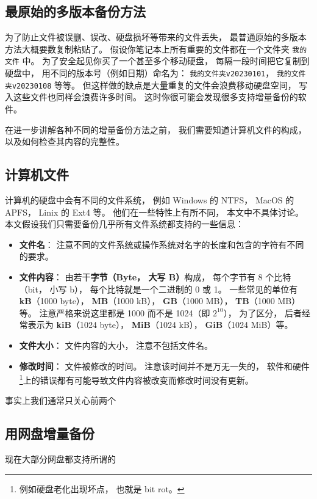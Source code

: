 
\subsection{最原始的多版本备份方法}
为了防止文件被误删、误改、硬盘损坏等带来的文件丢失， 最普通原始的多版本方法大概要数复制粘贴了。 假设你笔记本上所有重要的文件都在一个文件夹 \verb|我的文件| 中。 为了安全起见你买了一个甚至多个移动硬盘， 每隔一段时间把它复制到硬盘中， 用不同的版本号（例如日期）命名为： \verb|我的文件夹v20230101|， \verb|我的文件夹v20230108| 等等。 但这样做的缺点是大量重复的文件会浪费移动硬盘空间， 写入这些文件也同样会浪费许多时间。 这时你很可能会发现很多支持增量备份的软件。

在进一步讲解各种不同的增量备份方法之前， 我们需要知道计算机文件的构成， 以及如何检查其内容的完整性。

\subsection{计算机文件}
计算机的硬盘中会有不同的文件系统， 例如 Windows 的 NTFS， MacOS 的 APFS， Linix 的 Ext4 等。 他们在一些特性上有所不同， 本文中不具体讨论。 本文假设我们只需要备份几乎所有文件系统都支持的一些信息：
\begin{itemize}
\item \textbf{文件名}： 注意不同的文件系统或操作系统对名字的长度和包含的字符有不同的要求。
\item \textbf{文件内容}： 由若干\textbf{字节（Byte， 大写 B）}构成， 每个字节有 8 个比特（bit， 小写 b）， 每个比特就是一个二进制的 0 或 1。 一些常见的单位有 \textbf{kB}（1000 byte）， \textbf{MB}（1000 kB）， \textbf{GB}（1000 MB）， \textbf{TB}（1000 MB）等。 注意严格来说这里都是 1000 而不是 1024（即 $2^{10}$）， 为了区分， 后者经常表示为 \textbf{kiB}（1024 byte）， \textbf{MiB}（1024 kB）， \textbf{GiB}（1024 MiB）等。
\item \textbf{文件大小}： 文件内容的大小， 注意不包括文件名。
\item \textbf{修改时间}： 文件被修改的时间。 注意该时间并不是万无一失的， 软件和硬件\footnote{例如硬盘老化出现坏点， 也就是 bit rot。}上的错误都有可能导致文件内容被改变而修改时间没有更新。
\end{itemize}
事实上我们通常只关心前两个


\subsection{用网盘增量备份}
现在大部分网盘都支持所谓的
